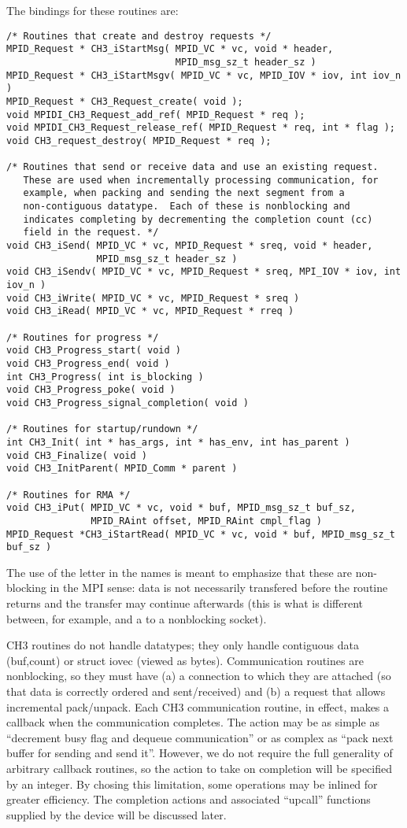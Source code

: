 \documentclass{article}
\begin{document}
The bindings for these routines are:
\begin{verbatim}
/* Routines that create and destroy requests */
MPID_Request * CH3_iStartMsg( MPID_VC * vc, void * header,
                              MPID_msg_sz_t header_sz )
MPID_Request * CH3_iStartMsgv( MPID_VC * vc, MPID_IOV * iov, int iov_n )
MPID_Request * CH3_Request_create( void );
void MPIDI_CH3_Request_add_ref( MPID_Request * req );
void MPIDI_CH3_Request_release_ref( MPID_Request * req, int * flag );
void CH3_request_destroy( MPID_Request * req );

/* Routines that send or receive data and use an existing request.
   These are used when incrementally processing communication, for
   example, when packing and sending the next segment from a
   non-contiguous datatype.  Each of these is nonblocking and
   indicates completing by decrementing the completion count (cc)
   field in the request. */
void CH3_iSend( MPID_VC * vc, MPID_Request * sreq, void * header,
                MPID_msg_sz_t header_sz )
void CH3_iSendv( MPID_VC * vc, MPID_Request * sreq, MPI_IOV * iov, int iov_n )
void CH3_iWrite( MPID_VC * vc, MPID_Request * sreq )
void CH3_iRead( MPID_VC * vc, MPID_Request * rreq )

/* Routines for progress */
void CH3_Progress_start( void )
void CH3_Progress_end( void )
int CH3_Progress( int is_blocking )
void CH3_Progress_poke( void )
void CH3_Progress_signal_completion( void )

/* Routines for startup/rundown */
int CH3_Init( int * has_args, int * has_env, int has_parent )
void CH3_Finalize( void )
void CH3_InitParent( MPID_Comm * parent )

/* Routines for RMA */
void CH3_iPut( MPID_VC * vc, void * buf, MPID_msg_sz_t buf_sz,
               MPID_RAint offset, MPID_RAint cmpl_flag )
MPID_Request *CH3_iStartRead( MPID_VC * vc, void * buf, MPID_msg_sz_t buf_sz )
\end{verbatim}

The use of the letter  in the names is meant to emphasize that these
are non-blocking in the MPI sense: data is not necessarily transfered before
the routine returns and the transfer may continue afterwards (this is what is
different between, for example,  and a  to a
nonblocking socket).

CH3 routines do not handle datatypes; they only handle contiguous data
(buf,count) or struct iovec (viewed as bytes).  Communication routines
are nonblocking, so they must have (a) a connection to which they are
attached (so that data is correctly ordered and sent/received) and (b)
a request that allows incremental pack/unpack.  Each CH3 communication
routine, in effect, makes a callback when the communication completes.
The action may be as simple as ``decrement busy flag and dequeue
communication'' or as complex as ``pack next buffer for sending and
send it''.  However, we do not require the full generality of
arbitrary callback routines, so the action to take on completion will
be specified by an integer.  By chosing this limitation, some
operations may be inlined for greater efficiency.  The completion
actions and associated ``upcall'' functions supplied by the device will be
discussed later.
\end{document}
